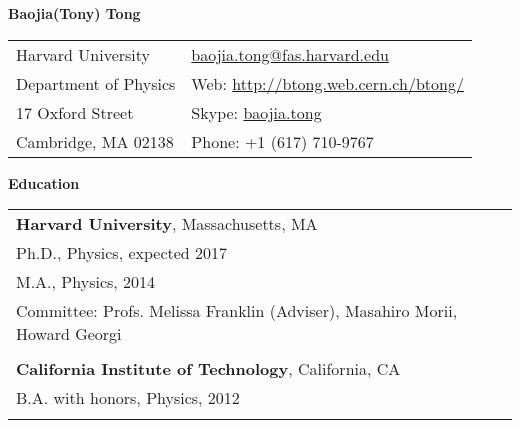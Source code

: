 \documentclass[letterpaper,11pt,oneside]{article}
\newcommand*{\Skype}{\href{skype:baojia.tong?add}{baojia.tong}}
\newcommand{\Absender}[1][\normalsize]{\Skype}
\newcommand{\blue}[1]{\textcolor[rgb]{0,0,0.9}{#1}}
\begin{document}

\noindent  \center \LARGE{\textbf{Baojia(Tony) Tong}}  \\
\vspace{1cm}
\normalsize
\begin{center}
\begin{tabular}{l l}
 Harvard University           & \hspace{1in} \href{mailto:baojia.tong@fas.harvard.edu}{baojia.tong@fas.harvard.edu} \\
 Department of Physics    & \hspace{1in} Web: \blue{\href{http://btong.web.cern.ch/btong/}{http://btong.web.cern.ch/btong/}}   \\
 17 Oxford Street              & \hspace{1in} Skype: \Absender  \\
 Cambridge, MA 02138     & \hspace{1in} Phone: +1 (617) 710-9767 \\
\end{tabular}
\end{center}
\noindent\makebox[\linewidth]{\rule{0.8\paperwidth}{1.5pt}}
\raggedright
\normalsize
\begin{flushleft}
\textbf{\Large{Education}} \\
\vspace{0.5cm}
 \begin{tabular}{@{} l}
     \textbf{Harvard University}, Massachusetts, MA \\
     Ph.D., Physics, expected 2017 \\
     M.A., Physics, 2014 \\
     Committee: Profs. Melissa Franklin (Adviser), Masahiro Morii, Howard Georgi \\
     \\
     \textbf{California Institute of Technology}, California, CA \\
     B.A. with honors, Physics, 2012 \\
     \\
 \end{tabular}
\end{flushleft}
 
\end{document}
